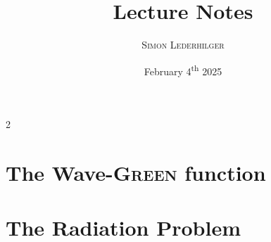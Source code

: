 \documentclass{article}
\title{Lecture Notes}
\subtitle{\textit{\headcourse}}
\author{\textsc{Simon Lederhilger}}
\date{February 4\textsuperscript{th} 2025}
\begin{document}
\maketitle\thispagestyle{fancy}
    \begin{multicols*}{2}
        \section[Green Function]{The Wave-\textsc{Green} function}
        \begingroup\endgroup

        \section[Radiation]{The Radiation Problem}
        \begingroup\endgroup

        \printbibliography
    \end{multicols*}
\end{document}
